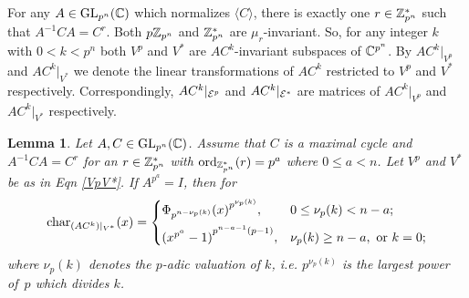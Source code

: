 \documentclass{article}
\newtheorem{lemma}[theorem]{Lemma}
\numberwithin{equation}{section}
\begin{document}
For any $A\in{\rm GL}_{p^n}({\Bbb C})$ which normalizes $\langle C\rangle$,
there is exactly one $r\in{\Bbb Z}_{p^n}^*$ such that $A^{-1}CA=C^r$.
Both $p{\Bbb Z}_{p^n}$ and ${\Bbb Z}_{p^n}^*$ are $\mu_r$-invariant.
So, for any integer $k$ with $0<k<p^n$ both $V^{p}$ and $V^{*}$
are $AC^k$-invariant subspaces of ${\Bbb C}^{p^n}$.
By $AC^k|_{V^p}$ and $AC^k|_{V^*}$ we denote the linear transformations 
of $AC^k$ restricted to $V^p$ and $V^*$ respectively. 
Correspondingly, 
$AC^k|_{{\cal E}^p}$ and $AC^k|_{{\cal E}^*}$ are
matrices of $AC^k|_{V^p}$ and $AC^k|_{V^*}$ respectively.

\begin{lemma} \label{AC^k}
Let $A,C\in{\rm GL}_{p^n}({\Bbb C})$.
Assume that $C$ is a maximal cycle and
$A^{-1}CA=C^r$ for an $r\in{\Bbb Z}_{p^n}^*$
with ${\rm ord}_{{\Bbb Z}_{p^{n}}^*}(r)=p^{a}$ where $0\le a<n$.
Let $V^p$ and $V^*$ be as in Eqn \eqref{VpV*}.
If $A^{p^{a}}=I$,  then for 
$${\rm char}_{(AC^k)|_{V^*}}(x)
=\begin{cases}{\Phi_{p^{n-\nu_p(k)}}(x)}^{p^{\nu_p(k)}}, & 0\le\nu_p(k)<n-a;\\[5pt]
 {(x^{p^a}-1)}^{p^{n-a-1}(p-1)}, &  \nu_p(k)\ge n-a,~{\rm or}~ k=0; \end{cases}
$$
where $\nu_p(k)$ denotes the $p$-adic valuation of $k$, i.e.
$p^{\nu_p(k)}$ is the largest power of~$p$ which divides $k$.
\end{lemma}
\end{document}
